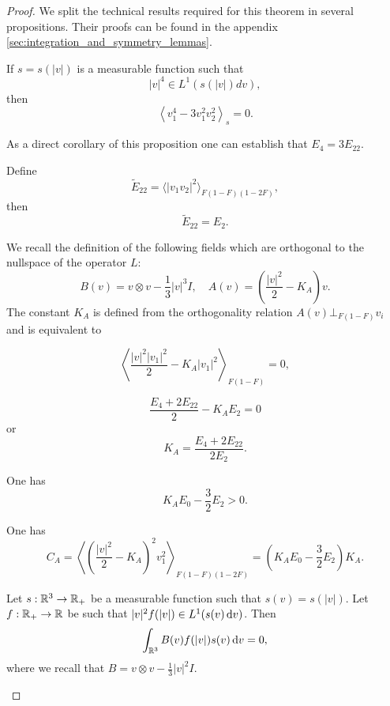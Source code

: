 \begin{proof}
We split the technical results required  for this theorem in several propositions. Their proofs can be found in the appendix \ref{sec:integration_and_symmetry_lemmas}.
\begin{proposition} \label{lemma:4-322} If $s=s(|v|)$ is a measurable function such that 
\[|v|^4\in L^1(s(|v|)dv),\] then
\[\left\langle v_1^4-3v_1^2v_2^2\right\rangle_{s}=0.\]
\end{proposition}

As a direct corollary of this proposition one can establish that $E_4=3E_{22}$.
\begin{proposition}\label{pr:tilde}
Define  
\[   \tilde E_{22}=\langle |v_1v_2|^2\rangle_{F(1-F)(1-2F)}, \] 
	then \[\tilde E_{22} =  E_2 .\]
\end{proposition}

We recall the definition of the following fields which are orthogonal to the nullspace of the operator $L$:
\[B(v)=v\otimes v -\frac 13 |v|^3I,\quad A(v)=\left(\frac{|v|^2}{2}-K_A\right)v.\] The constant 
$K_A$ is defined from the orthogonality relation $A(v)\bot_{F(1-F)}v_i$ and is equivalent to

\[\left\langle\frac{|v|^2|v_1|^2}{2}-K_A|v_1|^2\right\rangle_{F(1-F)}=0,\]

\[\frac{E_4+2E_{22}}{2}-K_AE_2=0\]
or
\[K_A=\frac{E_4+2E_{22}}{2E_2} \label{test}.\]

\begin{proposition}
	One has
  \begin{equation}\label{eq:KA}
	K_AE_0 -\frac{3}{2}  E_2 >0.
\end{equation} 

\end{proposition}


\begin{proposition}\label{pr:CA}One has 
	\[C_A=  \left\langle   \left(\frac{|v|^2}{2}-K_A\right)^2 v_1^2
\right\rangle_{F(1-F)(1-2F)}=\left( K_AE_0 -\frac{3}{2}  E_2 \right)K_A.\]
\end{proposition}

\begin{proposition}\label{pr:Bortho}
	Let $s:{\mathbb {R}^3}\to {\mathbb {R}}_+$ be a measurable function such that $s(v)=s(|v|)$. Let $f:{\mathbb {R}}_+\to {\mathbb {R}}$ be such that $|v|^2f(|v|)\in L^1(s(v){\,\mathrm{d} v})$. Then
	\[\int_{\mathbb {R}^3} B(v)f(|v|)s(v){\,\mathrm{d} v}=0,\]
	where we recall that $B=v\otimes v-\frac 13 |v|^2I$.
\end{proposition}


\end{proof}
